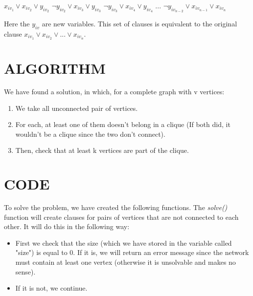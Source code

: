 \documentclass[table]{article}
\begin{document}
\begin{center}
$x_{iv_1} \lor x_{iv_2} \lor y_{iv_2} $ \newline
$\neg y_{iv_2} \lor x_{iv_3} \lor y_{iv_3} $ \newline
$\neg y_{iv_3} \lor x_{iv_4} \lor y_{iv_4} $ \newline
... \newline
$\neg y_{iv_{n-2}} \lor x_{iv_{n-1}} \lor x_{iv_n} $ \newline
\end{center}

\leftskip=0.5in 
Here the $y_{iv}$ are new variables. This set of clauses is equivalent to the original clause $x_{iv_1} \lor x_{iv_2} \lor ... \lor x_{iv_n} $.

\leftskip=0.0in  
\section{ALGORITHM}

\leftskip=0.5in  
We have found a solution, in which, for a complete graph with v vertices:
\begin{enumerate}\leftskip=0.8in 
\item We take all unconnected pair of vertices.
\item For each, at least one of them doesn't belong in a clique (If both did, it wouldn't be a clique since the two don't connect).
\item Then, check that at least k vertices are part of the clique.
\end{enumerate}

\leftskip=0.0in  
\section{CODE}

\leftskip=0.5in  
To solve the problem, we have created the following functions.
The \textit{solve()} function will create clauses for pairs of vertices that are not connected to each other. It will do this in the following way: \newline

\begin{itemize}\leftskip=0.8in
\item First we check that the size (which we have stored in the variable called "size") is equal to 0. If it is, we will return an error message since the network must contain at least one vertex (otherwise it is unsolvable and makes no sense).
\item If it is not, we continue.
\end{itemize}
 
\end{document}
